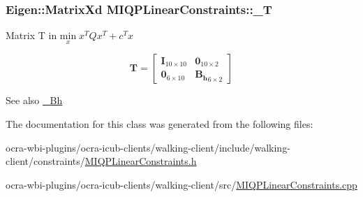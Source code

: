 \hypertarget{classMIQPLinearConstraints_a5e6d37521f3da248b19ff424526d700a}{
\subsubsection[{\-\_\-\-T}]{\setlength{\rightskip}{0pt plus 5cm}\-Eigen\-::\-Matrix\-Xd {\bf \-M\-I\-Q\-P\-Linear\-Constraints\-::\-\_\-\-T}}}\label{classMIQPLinearConstraints_a5e6d37521f3da248b19ff424526d700a}
\-Matrix \-T in $ \underset{x}{\text{min}}\; x^TQx^T + c^Tx $

\[ \mathbf{T} = \left[\begin{array}{cc} \mathbf{I}_{10\times10} & \mathbf{0}_{10\times2}\\ \mathbf{0}_{6\times10} & \mathbf{B_h}_{6\times2} \end{array}\right] \]

\begin{DoxySeeAlso}{\-See also}
\hyperlink{classMIQPLinearConstraints_a0c0fbbb1b86c5d51a133ee661977c1f5}{\-\_\-\-Bh} 
\end{DoxySeeAlso}


\-The documentation for this class was generated from the following files\-:\begin{DoxyCompactItemize}
\item 
ocra-\/wbi-\/plugins/ocra-\/icub-\/clients/walking-\/client/include/walking-\/client/constraints/\hyperlink{MIQPLinearConstraints_8h}{\-M\-I\-Q\-P\-Linear\-Constraints.\-h}\item 
ocra-\/wbi-\/plugins/ocra-\/icub-\/clients/walking-\/client/src/\hyperlink{MIQPLinearConstraints_8cpp}{\-M\-I\-Q\-P\-Linear\-Constraints.\-cpp}\end{DoxyCompactItemize}
